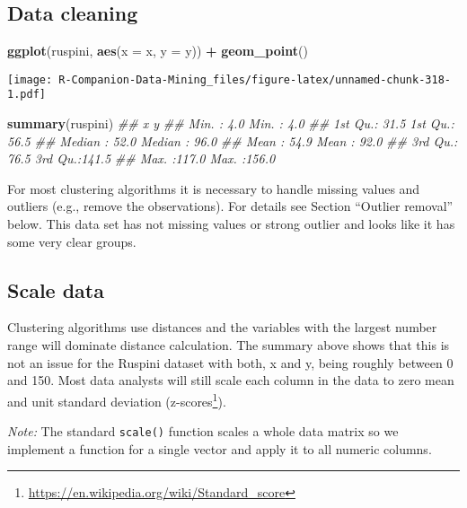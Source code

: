 \documentclass[
  notitlepage]{book}
\newenvironment{Shaded}{\begin{snugshade}}{\end{snugshade}}
\newcommand{\CommentTok}[1]{\textcolor[rgb]{0.56,0.35,0.01}{\textit{#1}}}
\newcommand{\DataTypeTok}[1]{\textcolor[rgb]{0.13,0.29,0.53}{#1}}
\newcommand{\KeywordTok}[1]{\textcolor[rgb]{0.13,0.29,0.53}{\textbf{#1}}}
\newcommand{\NormalTok}[1]{#1}
\newcommand{\OperatorTok}[1]{\textcolor[rgb]{0.81,0.36,0.00}{\textbf{#1}}}
\newcommand{\StringTok}[1]{\textcolor[rgb]{0.31,0.60,0.02}{#1}}
\DeclareRobustCommand{\href}[2]{#2\footnote{\url{#1}}}
\begin{document}
\hypertarget{data-cleaning}{%
\subsection{Data cleaning}\label{data-cleaning}}

\begin{Shaded}
\begin{Highlighting}[]
\KeywordTok{ggplot}\NormalTok{(ruspini, }\KeywordTok{aes}\NormalTok{(}\DataTypeTok{x =}\NormalTok{ x, }\DataTypeTok{y =}\NormalTok{ y)) }\OperatorTok{+}\StringTok{ }\KeywordTok{geom\_point}\NormalTok{()}
\end{Highlighting}
\end{Shaded}

\texttt{[image: R-Companion-Data-Mining\_files/figure-latex/unnamed-chunk-318-1.pdf]}

\begin{Shaded}
\begin{Highlighting}[]
\KeywordTok{summary}\NormalTok{(ruspini)}
\CommentTok{\#\#        x               y        }
\CommentTok{\#\#  Min.   :  4.0   Min.   :  4.0  }
\CommentTok{\#\#  1st Qu.: 31.5   1st Qu.: 56.5  }
\CommentTok{\#\#  Median : 52.0   Median : 96.0  }
\CommentTok{\#\#  Mean   : 54.9   Mean   : 92.0  }
\CommentTok{\#\#  3rd Qu.: 76.5   3rd Qu.:141.5  }
\CommentTok{\#\#  Max.   :117.0   Max.   :156.0}
\end{Highlighting}
\end{Shaded}

For most clustering algorithms it is necessary to handle missing values
and outliers (e.g., remove the observations). For details see Section
``Outlier removal'' below. This data set has not missing values or strong
outlier and looks like it has some very clear groups.

\hypertarget{scale-data}{%
\subsection{Scale data}\label{scale-data}}

Clustering algorithms use distances and the variables with the largest
number range will dominate distance calculation. The summary above shows
that this is not an issue for the Ruspini dataset with both, x and y,
being roughly between 0 and 150. Most data analysts will still scale
each column in the data to zero mean and unit standard deviation
(\href{https://en.wikipedia.org/wiki/Standard_score}{z-scores}).

\emph{Note:} The standard \texttt{scale()} function scales a whole data
matrix so we implement a function for a single vector and apply it to
all numeric columns.
\end{document}
